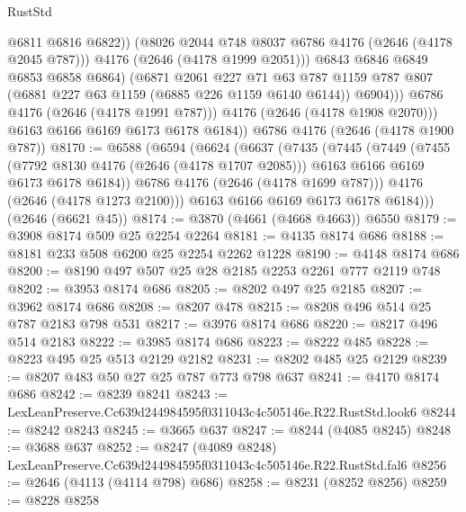 \begin{lexlean}{RustStd}
\begin{coremodule}
                        @6811
                        @6816
                        @6822))
                    (@8026 @2044 @748 @8037 @6786 @4176 (@2646 (@4178 @2045 @787)))
                    @4176
                    (@2646 (@4178 @1999 @2051)))
                  @6843
                  @6846
                  @6849
                  @6853
                  @6858
                  @6864)
                (@6871
                  @2061
                  @227
                  @71
                  @63
                  @787
                  @1159
                  @787
                  @807
                  (@6881 @227 @63 @1159 (@6885 @226 @1159 @6140 @6144))
                  @6904)))
            @6786
            @4176
            (@2646 (@4178 @1991 @787)))
          @4176
          (@2646 (@4178 @1908 @2070)))
        @6163
        @6166
        @6169
        @6173
        @6178
        @6184))
    @6786
    @4176
    (@2646 (@4178 @1900 @787))
@8170 := @6588
    (@6594
      (@6624
        (@6637
          (@7435
            (@7445
              (@7449
                (@7455
                  (@7792 @8130 @4176 (@2646 (@4178 @1707 @2085)))
                  @6163
                  @6166
                  @6169
                  @6173
                  @6178
                  @6184))
              @6786
              @4176
              (@2646 (@4178 @1699 @787)))
            @4176
            (@2646 (@4178 @1273 @2100)))
          @6163
          @6166
          @6169
          @6173
          @6178
          @6184)))
    (@2646 (@6621 @45))
@8174 := @3870 (@4661 (@4668 @4663)) @6550
@8179 := @3908 @8174 @509 @25 @2254 @2264
@8181 := @4135 @8174 @686
@8188 := @8181 @233 @508 @6200 @25 @2254 @2262 @1228
@8190 := @4148 @8174 @686
@8200 := @8190 @497 @507 @25 @28 @2185 @2253 @2261 @777 @2119 @748
@8202 := @3953 @8174 @686
@8205 := @8202 @497 @25 @2185
@8207 := @3962 @8174 @686
@8208 := @8207 @478
@8215 := @8208 @496 @514 @25 @787 @2183 @798 @531
@8217 := @3976 @8174 @686
@8220 := @8217 @496 @514 @2183
@8222 := @3985 @8174 @686
@8223 := @8222 @485
@8228 := @8223 @495 @25 @513 @2129 @2182
@8231 := @8202 @485 @25 @2129
@8239 := @8207 @483 @50 @27 @25 @787 @773 @798 @637
@8241 := @4170 @8174 @686
@8242 := @8239 @8241
@8243 := LexLeanPreserve.Cc639d244984595f0311043c4c505146e.R22.RustStd.look6
@8244 := @8242 @8243
@8245 := @3665 @637
@8247 := @8244 (@4085 @8245)
@8248 := @3688 @637
@8252 := @8247 (@4089 @8248) LexLeanPreserve.Cc639d244984595f0311043c4c505146e.R22.RustStd.fal6
@8256 := @2646 (@4113 (@4114 @798) @686)
@8258 := @8231 (@8252 @8256)
@8259 := @8228 @8258

\end{coremodule}
\end{lexlean}
